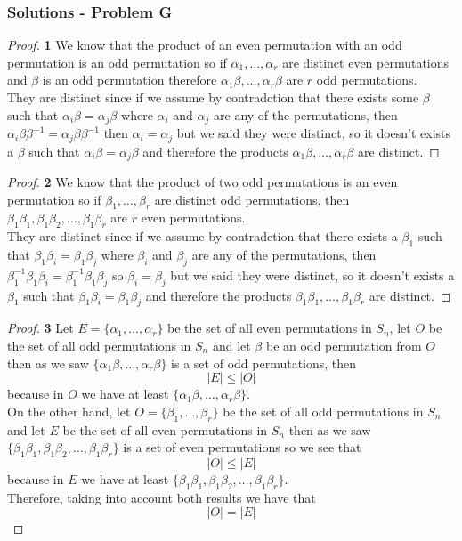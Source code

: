 \documentclass[11pt]{article}
\begin{document}
		\subsubsection*{Solutions - Problem G}
		\begin{proof}{\textbf{1}}
			We know that the product of an even permutation with an odd
			permutation is an odd permutation so if $\alpha_1, \dots, \alpha_r$
			are distinct even permutations and $\beta$ is an odd permutation
			therefore $\alpha_1\beta, \dots, \alpha_r\beta$ are $r$ odd permutations.\\
			They are distinct since if we assume by contradction that there
			exists some $\beta$ such that $\alpha_i\beta = \alpha_j\beta$ where
			$\alpha_i$ and $\alpha_j$ are any of the permutations, then
			$\alpha_i\beta\beta^{-1} = \alpha_j\beta\beta^{-1}$ then
			$\alpha_i = \alpha_j$ but we said they were distinct, so it
			doesn't exists a $\beta$ such that $\alpha_i\beta = \alpha_j\beta$
			and therefore the products $\alpha_1\beta, \dots, \alpha_r\beta$ are
			distinct.
		\end{proof}
		\begin{proof}{\textbf{2}}
			We know that the product of two odd permutations is an even
			permutation so if $\beta_1, \dots, \beta_r$ are distinct odd permutations,
			then \\
			$\beta_1\beta_1, \beta_1\beta_2, \dots, \beta_1\beta_r$
			are $r$ even permutations.\\
			They are distinct since if we assume by contradction that there
			exists a $\beta_1$ such that $\beta_1\beta_i = \beta_1\beta_j$ where
			$\beta_i$ and $\beta_j$ are any of the permutations, then
			$\beta_1^{-1}\beta_1\beta_i = \beta_1^{-1}\beta_1\beta_j$ so
			$\beta_i = \beta_j$ but we said they were distinct, so it
			doesn't exists a $\beta_1$ such that $\beta_1\beta_i = \beta_1\beta_j$
			and therefore the products $\beta_1\beta_1, \dots, \beta_1\beta_r$ are
			distinct.
		\end{proof}
		\begin{proof}{\textbf{3}}
			Let $E = \{\alpha_1, \dots, \alpha_r\}$ be the set of all even
			permutations in $S_n$, let $O$ be the set of all odd permutations
			in $S_n$ and let $\beta$ be an odd permutation from $O$ then as we
			saw $\{\alpha_1\beta, \dots, \alpha_r\beta\}$ is a set of odd 
			permutations, then
			$$|E| \leq |O|$$
			because in $O$ we have at least $\{\alpha_1\beta, \dots, \alpha_r\beta\}$.\\ 
			On the other hand, let $O = \{\beta_1, \dots, \beta_r\}$ be the set
			of all odd permutations in $S_n$ and let $E$ be the set of all even
			permutations in $S_n$ then as we saw
			$\{\beta_1\beta_1, \beta_1\beta_2, \dots, \beta_1\beta_r\}$ is a
			set of even permutations so we see that
			$$|O| \leq |E|$$
			because in $E$ we have at least $\{\beta_1\beta_1, \beta_1\beta_2, \dots, \beta_1\beta_r\}$.\\
			Therefore, taking into account both results we have that
			$$|O| = |E|$$
		\end{proof}
\end{document}

